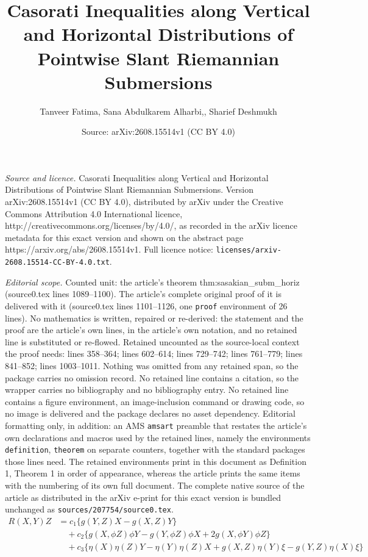 \documentclass[10pt,a4paper]{amsart}
\title{Casorati Inequalities along Vertical and Horizontal Distributions of Pointwise Slant Riemannian Submersions}
\author{Tanveer Fatima, Sana Abdulkarem Alharbi,, Sharief Deshmukh}
\date{Source: arXiv:2608.15514v1 (CC BY 4.0)}
\begin{document}
\maketitle

\noindent\emph{Source and licence.} Casorati Inequalities along Vertical and Horizontal Distributions of Pointwise Slant Riemannian Submersions. Version arXiv:2608.15514v1 (CC BY 4.0), distributed by arXiv under the Creative Commons Attribution 4.0 International licence, http://creativecommons.org/licenses/by/4.0/, as recorded in the arXiv licence metadata for this exact version and shown on the abstract page https://arxiv.org/abs/2608.15514v1. Full licence notice: \texttt{licenses/arxiv-2608.15514-CC-BY-4.0.txt}.\par\smallskip

\noindent\textit{Editorial scope.} Counted unit: the article's theorem thm:sasakian\_subm\_horiz (source0.tex lines 1089--1100). The article's complete original proof of it is delivered with it (source0.tex lines 1101--1126, one \texttt{proof} environment of 26 lines). No mathematics is written, repaired or re-derived: the statement and the proof are the article's own lines, in the article's own notation, and no retained line is substituted or re-flowed.  Retained uncounted as the source-local context the proof needs: lines 358--364; lines 602--614; lines 729--742; lines 761--779; lines 841--852; lines 1003--1011.  Nothing was omitted from any retained span, so the package carries no omission record.  No retained line contains a citation, so the wrapper carries no bibliography and no bibliography entry.  No retained line contains a figure environment, an image-inclusion command or drawing code, so no image is delivered and the package declares no asset dependency.  Editorial formatting only, in addition: an AMS \texttt{amsart} preamble that restates the article's own declarations and macros used by the retained lines, namely the environments \texttt{definition}, \texttt{theorem} on separate counters, together with the standard packages those lines need.  The retained environments print in this document as Definition 1, Theorem 1 in order of appearance, whereas the article prints the same items with the numbering of its own full document.  The complete native source of the article as distributed in the arXiv e-print for this exact version is bundled unchanged as \texttt{sources/207754/source0.tex}.
\begin{align}\label{eq:gen_sasakian_curvature}
R(X,Y)Z &= c_1\{g(Y,Z)X - g(X,Z)Y\} \nonumber\\
&\quad + c_2\{g(X,\phi Z)\phi Y - g(Y,\phi Z)\phi X 
            + 2g(X,\phi Y)\phi Z\} \nonumber\\
&\quad + c_3\{\eta(X)\eta(Z)Y - \eta(Y)\eta(Z)X 
            + g(X,Z)\eta(Y)\xi - g(Y,Z)\eta(X)\xi\}
\end{align}
\end{document}
